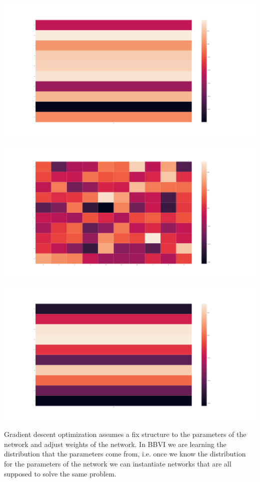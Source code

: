 \documentclass[]{article}
\begin{document}
\begin{center}
	\includegraphics[width=\linewidth]{Figures/b0.png}
\end{center}
\begin{center}
	\includegraphics[width=\linewidth]{Figures/W1.png}
\end{center}
\begin{center}
	\includegraphics[width=\linewidth]{Figures/b1.png}
\end{center}
Gradient descent optimization assumes a fix structure to the parameters of the network and adjust weights of the network. In BBVI we are learning the distribution that the parameters come from, i.e. once we know the distribution for the parameters of the network we can instantiate networks that are all supposed to solve the same problem. 
\end{document}
